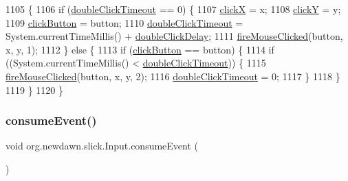 \begin{DoxyCode}
1105                                                               \{
1106         \textcolor{keywordflow}{if} (\mbox{\hyperlink{classorg_1_1newdawn_1_1slick_1_1_input_a5890660cb280ce9aa2c5fc29846901b0}{doubleClickTimeout}} == 0) \{
1107             \mbox{\hyperlink{classorg_1_1newdawn_1_1slick_1_1_input_a632aa28f148933d7415c689fa25a7329}{clickX}} = x;
1108             \mbox{\hyperlink{classorg_1_1newdawn_1_1slick_1_1_input_afa80ac9c5eee8d3accdc97ad00c6ca12}{clickY}} = y;
1109             \mbox{\hyperlink{classorg_1_1newdawn_1_1slick_1_1_input_a386f45644fd888480c6f0b2c71c8e530}{clickButton}} = button;
1110             \mbox{\hyperlink{classorg_1_1newdawn_1_1slick_1_1_input_a5890660cb280ce9aa2c5fc29846901b0}{doubleClickTimeout}} = System.currentTimeMillis() + 
      \mbox{\hyperlink{classorg_1_1newdawn_1_1slick_1_1_input_a42e5b78568d9726aae78751b4b9bac3f}{doubleClickDelay}};
1111             \mbox{\hyperlink{classorg_1_1newdawn_1_1slick_1_1_input_aa81fced043739508e3df8e050767538c}{fireMouseClicked}}(button, x, y, 1);
1112         \} \textcolor{keywordflow}{else} \{
1113             \textcolor{keywordflow}{if} (\mbox{\hyperlink{classorg_1_1newdawn_1_1slick_1_1_input_a386f45644fd888480c6f0b2c71c8e530}{clickButton}} == button) \{
1114                 \textcolor{keywordflow}{if} ((System.currentTimeMillis() < \mbox{\hyperlink{classorg_1_1newdawn_1_1slick_1_1_input_a5890660cb280ce9aa2c5fc29846901b0}{doubleClickTimeout}})) \{
1115                     \mbox{\hyperlink{classorg_1_1newdawn_1_1slick_1_1_input_aa81fced043739508e3df8e050767538c}{fireMouseClicked}}(button, x, y, 2);
1116                     \mbox{\hyperlink{classorg_1_1newdawn_1_1slick_1_1_input_a5890660cb280ce9aa2c5fc29846901b0}{doubleClickTimeout}} = 0;
1117                 \}
1118             \}
1119         \}
1120     \}
\end{DoxyCode}
\mbox{\label{classorg_1_1newdawn_1_1slick_1_1_input_a03ef6ccfdd2aed8c0d25111b1d310a40}} 
\subsubsection{\texorpdfstring{consume\+Event()}{consumeEvent()}}
{\footnotesize\ttfamily void org.\+newdawn.\+slick.\+Input.\+consume\+Event (\begin{DoxyParamCaption}{ }\end{DoxyParamCaption})\hspace{0.3cm}{\ttfamily [inline]}}

